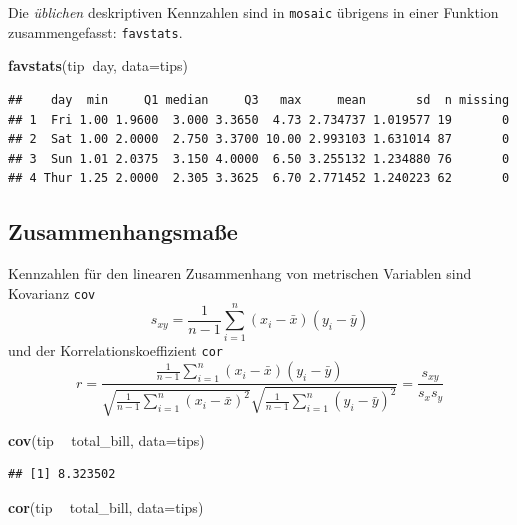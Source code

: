 \documentclass[12pt,ngerman,paper=a4,pagesize,DIV=13]{scrreprt}
\newenvironment{Shaded}{\begin{snugshade}}{\end{snugshade}}
\newcommand{\DataTypeTok}[1]{\textcolor[rgb]{0.13,0.29,0.53}{#1}}
\newcommand{\KeywordTok}[1]{\textcolor[rgb]{0.13,0.29,0.53}{\textbf{#1}}}
\newcommand{\NormalTok}[1]{#1}
\newcommand{\OperatorTok}[1]{\textcolor[rgb]{0.81,0.36,0.00}{\textbf{#1}}}
\newcommand{\StringTok}[1]{\textcolor[rgb]{0.31,0.60,0.02}{#1}}
\begin{document}
Die \emph{üblichen} deskriptiven Kennzahlen sind in \texttt{mosaic}
übrigens in einer Funktion zusammengefasst: \texttt{favstats}.

\begin{Shaded}
\begin{Highlighting}[]
\KeywordTok{favstats}\NormalTok{(tip}\OperatorTok{~}\NormalTok{day, }\DataTypeTok{data=}\NormalTok{tips)}
\end{Highlighting}
\end{Shaded}

\begin{verbatim}
##    day  min     Q1 median     Q3   max     mean       sd  n missing
## 1  Fri 1.00 1.9600  3.000 3.3650  4.73 2.734737 1.019577 19       0
## 2  Sat 1.00 2.0000  2.750 3.3700 10.00 2.993103 1.631014 87       0
## 3  Sun 1.01 2.0375  3.150 4.0000  6.50 3.255132 1.234880 76       0
## 4 Thur 1.25 2.0000  2.305 3.3625  6.70 2.771452 1.240223 62       0
\end{verbatim}

\hypertarget{zusammenhangsmae}{%
\subsection{Zusammenhangsmaße}\label{zusammenhangsmae}}

Kennzahlen für den linearen Zusammenhang von metrischen Variablen sind
Kovarianz \texttt{cov}
\[s_{xy}=\frac{1}{n-1}\sum_{i=1}^{n}(x_{i}-\bar{x})(y_{i}-\bar{y})\] und
der Korrelationskoeffizient \texttt{cor}
\[r=\frac{\frac{1}{n-1}\sum_{i=1}^{n}(x_{i}-\bar{x})(y_{i}-\bar{y})}{\sqrt{\frac{1}{n-1}\sum_{i=1}^{n}(x_{i}-\bar{x})^2}\sqrt{\frac{1}{n-1}\sum_{i=1}^{n}(y_{i}-\bar{y})^2}}=\frac{s_{xy}}{s_{x}s_{y}}\]

\begin{Shaded}
\begin{Highlighting}[]
\KeywordTok{cov}\NormalTok{(tip }\OperatorTok{~}\StringTok{ }\NormalTok{total_bill, }\DataTypeTok{data=}\NormalTok{tips)}
\end{Highlighting}
\end{Shaded}

\begin{verbatim}
## [1] 8.323502
\end{verbatim}

\begin{Shaded}
\begin{Highlighting}[]
\KeywordTok{cor}\NormalTok{(tip }\OperatorTok{~}\StringTok{ }\NormalTok{total_bill, }\DataTypeTok{data=}\NormalTok{tips)}
\end{Highlighting}
\end{Shaded}
\end{document}
